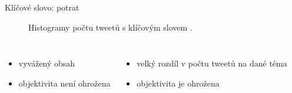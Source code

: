 \documentclass[notheorems,12pt]{beamer}
\begin{document}
\begin{frame}{Klíčové slovo: potrat}
    \begin{figure}
        \centering
        \vspace{-0.7cm}
        \caption*{Histogramy počtu tweetů s klíčovým slovem \textit{}.}
    \end{figure}
\begin{columns}
\column{6cm}
	\begin{itemize}
		\item vyvážený obsah
		\item objektivita není ohrožena
	\end{itemize}
\column{6cm}
	\begin{itemize}
		\item velký rozdíl v počtu tweetů na dané téma
		\item objektivita je ohrožena
	\end{itemize}
\end{columns}
\end{frame}
\end{document}

